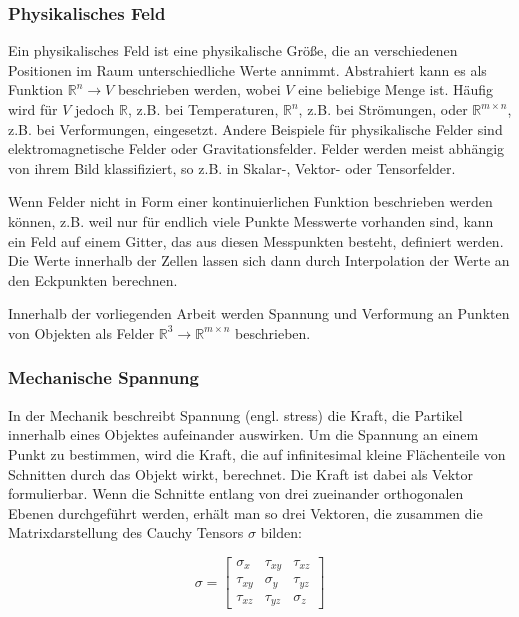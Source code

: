 \documentclass[a4paper,fontsize=12pt,toc=bib,halfparskip,ngerman]{scrartcl}
\begin{document}
\subsubsection{Physikalisches Feld}
Ein physikalisches Feld ist eine physikalische Gr\"o{\ss}e, die an verschiedenen Positionen im Raum unterschiedliche Werte annimmt\cite[1–2 Electric and magnetic fields]{feynman2011feynman}. Abstrahiert kann es als Funktion $\mathbb{R}^n \rightarrow V$ beschrieben werden, wobei $V$ eine beliebige Menge ist. H\"aufig wird f\"ur $V$ jedoch $\mathbb{R}$, z.B. bei Temperaturen, $\mathbb{R}^n$, z.B. bei Str\"omungen, oder $\mathbb{R}^{m\times n}$, z.B. bei Verformungen, eingesetzt. Andere Beispiele f\"ur physikalische Felder sind elektromagnetische Felder oder Gravitationsfelder. Felder werden meist abh\"angig von ihrem Bild klassifiziert, so z.B. in Skalar-, Vektor- oder Tensorfelder.

Wenn Felder nicht in Form einer kontinuierlichen Funktion beschrieben werden k\"onnen, z.B. weil nur f\"ur endlich viele Punkte Messwerte vorhanden sind, kann ein Feld auf einem Gitter, das aus diesen Messpunkten besteht, definiert werden. Die Werte innerhalb der Zellen lassen sich dann durch Interpolation der Werte an den Eckpunkten berechnen.


Innerhalb der vorliegenden Arbeit werden Spannung und Verformung an Punkten von Objekten als Felder $\mathbb{R}^3 \rightarrow \mathbb{R}^{m\times n}$ beschrieben.


\subsubsection{Mechanische Spannung}
In der Mechanik beschreibt Spannung (engl. stress) die Kraft, die Partikel innerhalb eines Objektes aufeinander auswirken. Um die Spannung an einem Punkt zu bestimmen, wird die Kraft, die auf infinitesimal kleine Fl\"achenteile von Schnitten durch das Objekt wirkt, berechnet. Die Kraft ist dabei als Vektor formulierbar. Wenn die Schnitte entlang von drei zueinander orthogonalen Ebenen durchgef\"uhrt werden, erh\"alt man so drei Vektoren, die zusammen die Matrixdarstellung des Cauchy Tensors $\sigma$ bilden:

\begin{equation}
	\sigma =  
	\begin{bmatrix}
		\sigma_x & \tau_{xy} & \tau_{xz}\\
		\tau_{xy} & \sigma_y & \tau_{yz}\\
		\tau_{xz} & \tau_{yz} & \sigma_z
	\end{bmatrix}
\end{equation}
\end{document}
